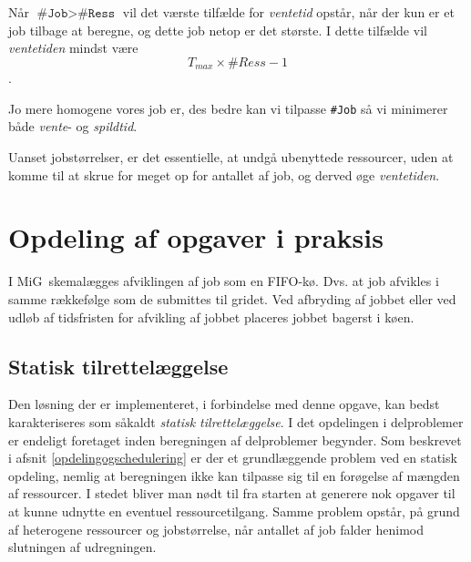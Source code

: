 \documentclass[final,a4paper,11pt]{article}
\newcommand{\mig}{MiG}
\begin{document}
Når $\texttt{\#Job} > \texttt{\#Ress}$ vil det værste tilfælde for \emph{ventetid} opstår, når der kun er et job tilbage at beregne, og dette job netop er det største. I dette tilfælde vil \emph{ventetiden} mindst være 
\[
T_{max} \times \#Ress -1
\]
.



Jo mere homogene vores job er, des bedre kan vi tilpasse \texttt{\#Job} så vi minimerer både \emph{vente}- og \emph{spildtid}. 

Uanset jobstørrelser, er det essentielle, at undgå ubenyttede ressourcer, uden at komme til at skrue for meget op for antallet af job, og derved øge \emph{ventetiden}.




\section{Opdeling af opgaver i praksis}\label{opdelingipraksis}

I \mig\ skemalægges afviklingen af job som en FIFO-kø. Dvs. at job afvikles i samme rækkefølge som de submittes til gridet. Ved afbryding af jobbet eller ved udløb af tidsfristen for afvikling af jobbet placeres jobbet bagerst i køen. 


\subsection{Statisk tilrettelæggelse}
Den løsning der er implementeret, i forbindelse med denne opgave, kan bedst karakteriseres som såkaldt \emph{statisk tilrettelæggelse}. I det opdelingen i delproblemer er endeligt foretaget inden beregningen af delproblemer begynder. Som beskrevet i afsnit \ref{opdelingogschedulering} er der et grundlæggende problem ved en statisk opdeling, nemlig at beregningen ikke kan tilpasse sig til en forøgelse af mængden af ressourcer. I stedet bliver man nødt til fra starten at generere nok opgaver til at kunne udnytte en eventuel ressourcetilgang. Samme problem opstår, på grund af heterogene ressourcer og jobstørrelse, når antallet af job falder henimod slutningen af udregningen. 
\end{document}
